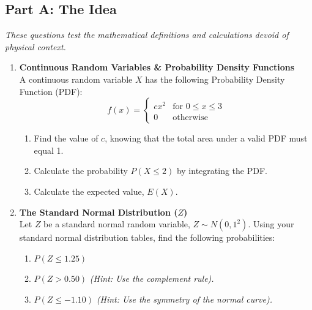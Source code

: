 
\subsection*{Part A: The Idea}
\textit{These questions test the mathematical definitions and calculations devoid of physical context.}

\begin{enumerate}[label=\textbf{Q\arabic*.}, leftmargin=*]
    \item \textbf{Continuous Random Variables \& Probability Density Functions} \\
    A continuous random variable $X$ has the following Probability Density Function (PDF):
    $$
    f(x) = \begin{cases} 
    cx^2 & \text{for } 0 \leq x \leq 3 \\ 
    0 & \text{otherwise} 
    \end{cases}
    $$
    \begin{enumerate}[label=\arabic*.]
        \item Find the value of $c$, knowing that the total area under a valid PDF must equal 1.
        \item Calculate the probability $P(X \leq 2)$ by integrating the PDF.
        \item Calculate the expected value, $E(X)$.
    \end{enumerate}
    \vspace{0.3cm}

    \item \textbf{The Standard Normal Distribution ($Z$)} \\
    Let $Z$ be a standard normal random variable, $Z \sim N(0, 1^2)$. Using your standard normal distribution tables, find the following probabilities:
    \begin{enumerate}[label=\arabic*.]
        \item $P(Z \leq 1.25)$
        \item $P(Z > 0.50)$ \textit{(Hint: Use the complement rule).}
        \item $P(Z \leq -1.10)$ \textit{(Hint: Use the symmetry of the normal curve).}
    \end{enumerate}
    \vspace{0.3cm}


\end{enumerate}
